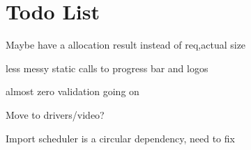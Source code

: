 \chapter{Todo List}
\hypertarget{todo}{}\label{todo}

\begin{DoxyRefList}
\item[File \doxylink{allocator_8h}{allocator.h} ]\label{todo__todo000010}%
%
Maybe have a allocation result instead of req,actual size  
\item[File \doxylink{framebuffer_8cpp}{framebuffer.cpp} ]\label{todo__todo000025}%
%
less messy static calls to progress bar and logos  
\item[File \doxylink{gdbstub_8h}{gdbstub.h} ]\label{todo__todo000019}%
%
almost zero validation going on 
\item[File \doxylink{graphicsContext_8h}{graphics\+Context.h} ]\label{todo__todo000001}%
%
Move to drivers/video?  
\item[File \doxylink{ipc_8cpp}{ipc.cpp} ]\label{todo__todo000043}%
%
Import scheduler is a circular dependency, need to fix 




\end{DoxyRefList}
